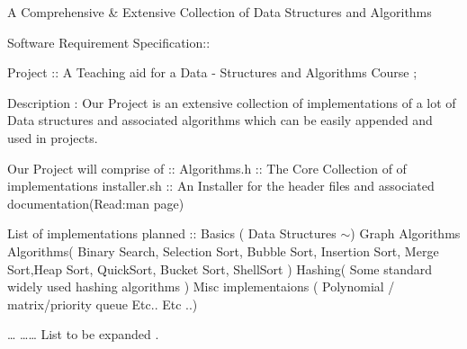 A Comprehensive \& Extensive Collection of Data Structures and Algorithms

Software Requirement Specification\-:\-:

Project \-:\-: A Teaching aid for a Data -\/ Structures and Algorithms Course ;

Description \-: Our Project is an extensive collection of implementations of a lot of Data structures and associated algorithms which can be easily appended and used in projects.

Our Project will comprise of \-:\-: Algorithms.\-h \-:\-: The Core Collection of of implementations installer.\-sh \-:\-: An Installer for the header files and associated documentation(\-Read\-:man page)

List of implementations planned \-:\-: Basics ( Data Structures $\sim$) Graph Algorithms Algorithms( Binary Search, Selection Sort, Bubble Sort, Insertion Sort, Merge Sort,\-Heap Sort, Quick\-Sort, Bucket Sort, Shell\-Sort ) Hashing( Some standard widely used hashing algorithms ) Misc implementaions ( Polynomial / matrix/priority queue Etc.. Etc ..)

… …… List to be expanded . 